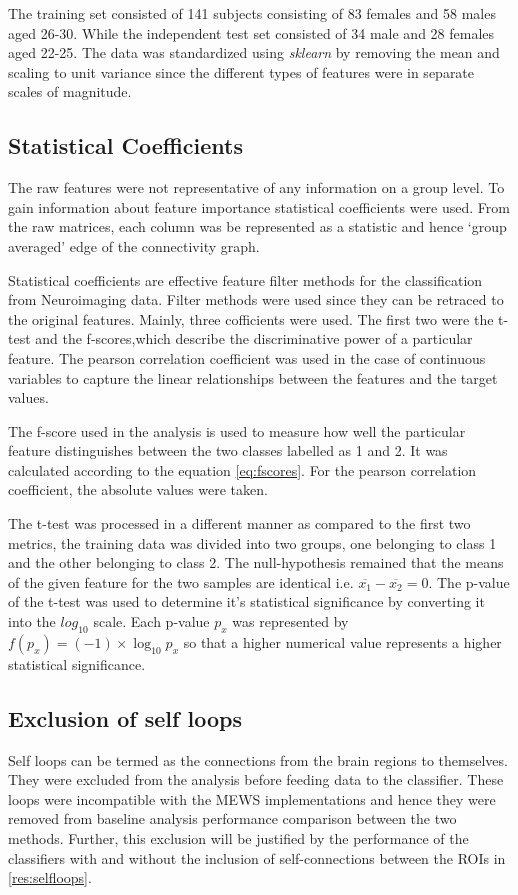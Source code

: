 \documentclass[msthesis.tex]{subfiles}
\begin{document}
The training set consisted of 141 subjects consisting of 83 females and 58 males aged 26-30. While the independent test set consisted of 34 male and 28 females aged 22-25. The data was standardized using \textit{sklearn} by removing the mean and scaling to unit variance since the different types of features were in separate scales of magnitude.

\subsection{Statistical Coefficients}
\label{subsub:statcoef}
The raw features were not representative of any information on a group level. To gain information about feature importance statistical coefficients were used. From the raw matrices, each column was be represented as a statistic and hence `group averaged' edge of the connectivity graph. 

Statistical coefficients are effective feature filter methods for the classification from Neuroimaging data. Filter methods were used since they can be retraced to the original features. Mainly, three cofficients were used. The first two were the t-test and the f-scores,which describe the discriminative power of a particular feature. The pearson correlation coefficient was used in the case of continuous variables to capture the linear relationships between the features and the target values. 

The f-score used in the analysis is used to measure how well the particular feature distinguishes between the two classes labelled as 1 and 2. It was calculated according to the equation \autoref{eq:fscores}. For the pearson correlation coefficient, the absolute values were taken.

The t-test was processed in a different manner as compared to the first two metrics, the training data was divided into two groups, one belonging to class 1 and the other belonging to class 2. The null-hypothesis remained that the means of the given feature for the two samples are identical i.e. $\overline{x_{1}} - \overline{x_{2}} = 0$. The p-value of the t-test was used to determine it's statistical significance by converting it into the $log_{10}$ scale. Each p-value $p_x$ was represented by $ f(p_{x}) = (-1) \times \log_{10} p_x$ so that a higher numerical value represents a higher statistical significance.  
\subsection{Exclusion of self loops}
\label{sec:exclusion}
Self loops can be termed as the connections from the brain regions to themselves. They were excluded from the analysis before feeding data to the classifier. These loops were incompatible with the MEWS implementations and hence they were removed from baseline analysis performance comparison between the two methods. Further, this exclusion will be justified by the performance of the classifiers with and without the inclusion of self-connections between the ROIs in \autoref{res:selfloops}. 
\end{document}
